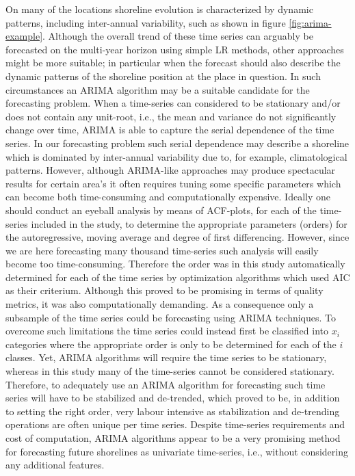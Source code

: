 \documentclass[format=sigconf, review=false, screen=true]{acmart}
\begin{document}
On many of the locations shoreline evolution is characterized by dynamic patterns, including inter-annual variability, such as shown in figure \ref{fig:arima-example}. Although the overall trend of these time series can arguably be forecasted on the multi-year horizon using simple LR methods, other approaches might be more suitable; in particular when the forecast should also describe the dynamic patterns of the shoreline position at the place in question. In such circumstances an ARIMA algorithm may be a suitable candidate for the forecasting problem. When a time-series can considered to be stationary and/or does not contain any unit-root, i.e., the mean and variance do not significantly change over time, ARIMA is able to capture the serial dependence of the time series. In our forecasting problem such serial dependence may describe a shoreline which is dominated by inter-annual variability due to, for example, climatological patterns. However, although ARIMA-like approaches may produce spectacular results for certain area's it often requires tuning some specific parameters which can become both time-consuming and computationally expensive. Ideally one should conduct an eyeball analysis by means of ACF-plots, for each of the time-series included in the study, to determine the appropriate parameters (orders) for the autoregressive, moving average and degree of first differencing. However, since we are here forecasting many thousand time-series such analysis will easily become too time-consuming. Therefore the order was in this study automatically determined for each of the time series by optimization algorithms which used AIC as their criterium. Although this proved to be promising in terms of quality metrics, it was also computationally demanding. As a consequence only a subsample of the time series could be forecasting using ARIMA techniques. To overcome such limitations the time series could instead first be classified into $x_i$ categories where the appropriate order is only to be determined for each of the $i$ classes. Yet, ARIMA algorithms will require the time series to be stationary, whereas in this study many of the time-series cannot be considered stationary. Therefore, to adequately use an ARIMA algorithm for forecasting such time series will have to be stabilized and de-trended, which proved to be, in addition to setting the right order, very labour intensive as stabilization and de-trending operations are often unique per time series. Despite time-series requirements and cost of computation, ARIMA algorithms appear to be a very promising method for forecasting future shorelines as univariate time-series, i.e., without considering any additional features. 
\end{document}
